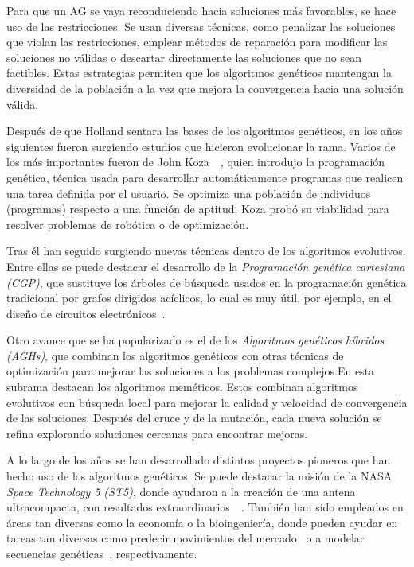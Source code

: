 Para que un AG se vaya reconduciendo hacia soluciones más favorables, se hace uso de las restricciones. Se usan diversas técnicas, como penalizar las soluciones que violan las restricciones, emplear métodos de reparación para modificar las soluciones no válidas o descartar directamente las soluciones que no sean factibles. Estas estrategias permiten que los algoritmos genéticos mantengan la diversidad de la población a la vez que mejora la convergencia hacia una solución válida.

Después de que Holland sentara las bases de los algoritmos genéticos, en los años siguientes fueron surgiendo estudios que hicieron evolucionar la rama. Varios de los más importantes fueron de John Koza~\cite{koza1992}~\cite{koza1994}, quien introdujo la programación genética, técnica usada para desarrollar automáticamente programas que realicen una tarea definida por el usuario. Se optimiza una población de individuos (programas) respecto a una función de aptitud. Koza probó su viabilidad para resolver problemas de robótica o de optimización.

Tras él han seguido surgiendo nuevas técnicas dentro de los algoritmos evolutivos. Entre ellas se puede destacar el desarrollo de la \textit{Programación genética cartesiana (CGP)}, que sustituye los árboles de búsqueda usados en la programación genética tradicional por grafos dirigidos acíclicos, lo cual es muy útil, por ejemplo, en el diseño de circuitos electrónicos~\cite{miller2000}.

Otro avance que se ha popularizado es el de los \textit{Algoritmos genéticos híbridos (AGHs)}, que combinan los algoritmos genéticos con otras técnicas de optimización para mejorar las soluciones a los problemas complejos.\newpage En esta subrama destacan los algoritmos meméticos. Estos combinan algoritmos evolutivos con búsqueda local para mejorar la calidad y velocidad de convergencia de las soluciones. Después del cruce y de la mutación, cada nueva solución se refina explorando soluciones cercanas para encontrar mejoras.~\cite{moscato2003}

A lo largo de los años se han desarrollado distintos proyectos pioneros que han hecho uso de los algoritmos genéticos. Se puede destacar la misión de la NASA \textit{Space Technology 5 (ST5)}, donde ayudaron a la creación de una antena ultracompacta, con resultados extraordinarios~\cite{nasa2006}~\cite{lohn2004}. También han sido empleados en áreas tan diversas como la economía o la bioingeniería, donde pueden ayudar en tareas tan diversas como predecir movimientos del mercado~\cite{abraham2022} o a modelar secuencias genéticas~\cite{notredame1996}, respectivamente.

